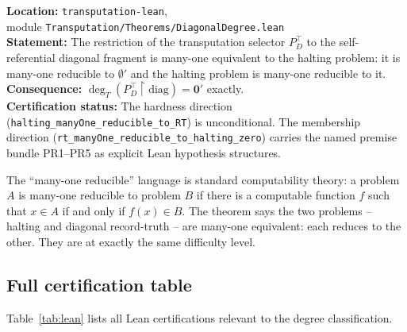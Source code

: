 \documentclass[11pt,a4paper]{article}
\newcommand{\lean}[1]{\texttt{#1}}
\newcommand{\zerp}{\mathbf{0}'}
\newcommand{\Ptop}{P^{\!\top}}
\begin{document}
\begin{tcolorbox}[colback=boxblue,colframe=blue!40!black,
  title={\lean{pt\_diagonal\_manyOne\_degree\_halting} (CatAL, zero sorry)}]
\small
\textbf{Location:} \texttt{transputation-lean},\\
 module \texttt{Transputation/Theorems/DiagonalDegree.lean}\\[6pt]
\textbf{Statement:} The restriction of the transputation selector $\Ptop_D$
to the self-referential diagonal fragment is many-one equivalent to the
halting problem: it is many-one reducible to $\emptyset'$ and the halting
problem is many-one reducible to it.\\[6pt]
\textbf{Consequence:} $\deg_T(\Ptop_D \!\upharpoonright\!\mathrm{diag}) = \zerp$ exactly.\\[6pt]
\textbf{Certification status:} The hardness direction
(\lean{halting\_manyOne\_reducible\_to\_RT}) is unconditional.
The membership direction (\lean{rt\_manyOne\_reducible\_to\_halting\_zero})
carries the named premise bundle PR1--PR5 as explicit Lean hypothesis
structures.
\end{tcolorbox}

\noindent
The ``many-one reducible'' language is standard computability theory: a
problem $A$ is many-one reducible to problem $B$ if there is a computable
function $f$ such that $x \in A$ if and only if $f(x) \in B$.  The theorem
says the two problems -- halting and diagonal record-truth -- are many-one
equivalent: each reduces to the other.  They are at exactly the same
difficulty level.

\subsection{Full certification table}

Table~\ref{tab:lean} lists all Lean certifications relevant to the degree
classification.
\end{document}
